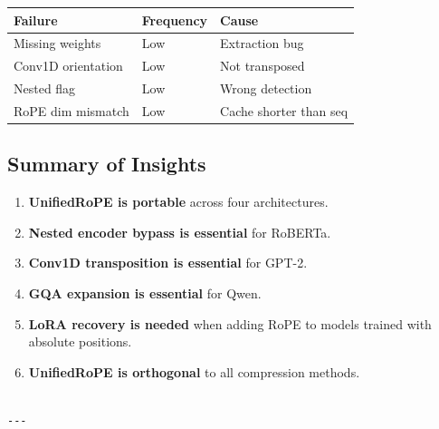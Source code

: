 \begin{table}[H]
\centering
\small
\begin{tabular}{lll}
\toprule
\textbf{Failure} & \textbf{Frequency} & \textbf{Cause} \\
\midrule
Missing weights & Low & Extraction bug \\
Conv1D orientation & Low & Not transposed \\
Nested flag & Low & Wrong detection \\
RoPE dim mismatch & Low & Cache shorter than seq \\
\bottomrule
\end{tabular}
\end{table}

\subsection{Summary of Insights}

\begin{enumerate}
\item \textbf{UnifiedRoPE is portable} across four architectures.
\item \textbf{Nested encoder bypass is essential} for RoBERTa.
\item \textbf{Conv1D transposition is essential} for GPT-2.
\item \textbf{GQA expansion is essential} for Qwen.
\item \textbf{LoRA recovery is needed} when adding RoPE to models trained with
  absolute positions.
\item \textbf{UnifiedRoPE is orthogonal} to all compression methods.
\end{enumerate}
\begin{lstlisting}

---
\end{lstlisting}